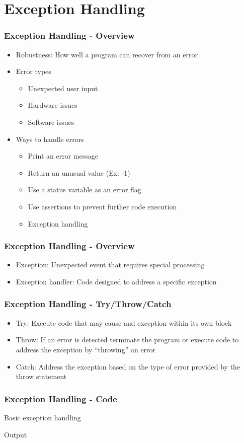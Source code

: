 \section{Exception Handling}
\begin{frame}\frametitle{Exception Handling - Overview}
\begin{itemize}
\item Robustness: How well a program can recover from an error
\item Error types
	\begin{itemize}
	\item Unexpected user input
	\item Hardware issues
	\item Software issues
	\end{itemize}
\item Ways to handle errors
	\begin{itemize}
	\item Print an error message
	\item Return an unusual value (Ex: -1)
	\item Use a status variable as an error flag
	\item Use assertions to prevent further code execution
	\item Exception handling
	\end{itemize}
\end{itemize}
\end{frame}

\begin{frame}\frametitle{Exception Handling - Overview}
\begin{itemize}
\item Exception: Unexpected event that requires special processing
\item Exception handler: Code designed to address a specific exception
\end{itemize}
\end{frame}

\begin{frame}\frametitle{Exception Handling - Try/Throw/Catch}
\begin{itemize}
\item Try: Execute code that may cause and exception within its own block
\item Throw: If an error is detected terminate the program or execute code to address the exception by ``throwing'' an error
\item Catch: Address the exception based on the type of error provided by the throw statement
\end{itemize}
\end{frame}

\begin{frame}\frametitle{Exception Handling - Code}
Basic exception handling


Output

\end{frame}
